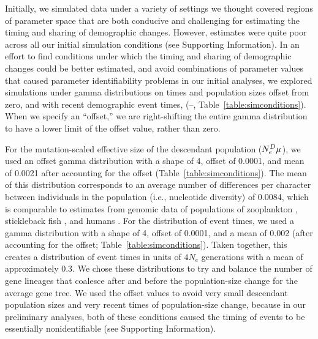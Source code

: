
Initially, we simulated data under a variety of settings we thought covered
regions of parameter space that are both conducive and challenging for
estimating the timing and sharing of demographic changes.
However, estimates were quite poor across all our initial simulation conditions
(see Supporting Information).
In an effort to find conditions under which the timing and sharing of
demographic changes could be better estimated, and avoid combinations of
parameter values that caused parameter identifiability problems in our initial
analyses,
we explored simulations under gamma distributions on times and population sizes
offset from zero, and with recent demographic event times,
(--, Table~\ref{table:simconditions}).
When we specify an ``offset,'' we are right-shifting the entire gamma distribution to
have a lower limit of the offset value, rather than zero.

\ifembed{

}{}

For the mutation-scaled effective size of the descendant
population
($\epopsize[\descendantpopindex{}]\murate$),
we used an offset gamma distribution with a shape of 4, offset of 0.0001, and
mean of 0.0021 after accounting for the offset
(Table~\ref{table:simconditions}).
The mean of this distribution corresponds to an average number of differences
per character between individuals in the population (i.e., nucleotide
diversity) of 0.0084, which is comparable to estimates from genomic data of
populations of
zooplankton \citep{Choquet2019},
stickleback fish \citep{Hohenlohe2010},
and humans \citep{Auton2015}.
For the distribution of event times, we used a gamma distribution with a shape
of 4, offset of 0.0001, and a mean of 0.002 (after accounting for the offset;
Table~\ref{table:simconditions}).
Taken together, this creates a distribution of event times in units of
$4N_e$ generations with a mean of approximately 0.3.
We chose these distributions to try and balance the number of gene lineages
that coalesce after and before the population-size change for the average gene
tree.
We used the offset values to avoid very small descendant population sizes and
very recent times of population-size change, because in our preliminary
analyses, both of these conditions caused the timing of events to be
essentially nonidentifiable (see Supporting Information).


